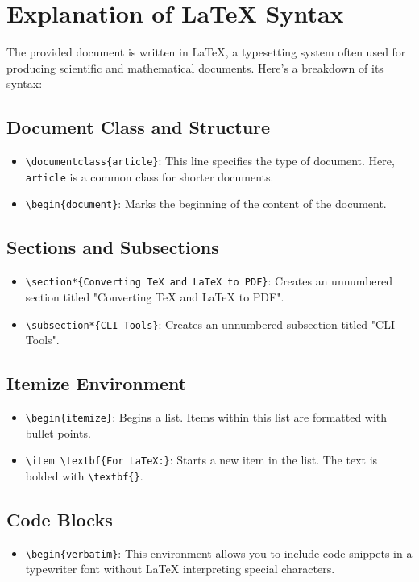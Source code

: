 \documentclass{article}
\begin{document}
\section*{Explanation of LaTeX Syntax}

The provided document is written in LaTeX, a typesetting system often used for producing scientific and mathematical documents. Here’s a breakdown of its syntax:

\subsection*{Document Class and Structure}
\begin{itemize}
    \item \texttt{\textbackslash documentclass\{article\}}: This line specifies the type of document. Here, \texttt{article} is a common class for shorter documents.
    \item \texttt{\textbackslash begin\{document\}}: Marks the beginning of the content of the document.
\end{itemize}

\subsection*{Sections and Subsections}
\begin{itemize}
    \item \texttt{\textbackslash section*\{Converting TeX and LaTeX to PDF\}}: Creates an unnumbered section titled "Converting TeX and LaTeX to PDF".
    \item \texttt{\textbackslash subsection*\{CLI Tools\}}: Creates an unnumbered subsection titled "CLI Tools".
\end{itemize}

\subsection*{Itemize Environment}
\begin{itemize}
    \item \texttt{\textbackslash begin\{itemize\}}: Begins a list. Items within this list are formatted with bullet points.
    \item \texttt{\textbackslash item \textbackslash textbf\{For LaTeX:\}}: Starts a new item in the list. The text is bolded with \texttt{\textbackslash textbf\{\}}.
\end{itemize}

\subsection*{Code Blocks}
\begin{itemize}
    \item \texttt{\textbackslash begin\{verbatim\}}: This environment allows you to include code snippets in a typewriter font without LaTeX interpreting special characters.
\end{itemize}
\end{document}
